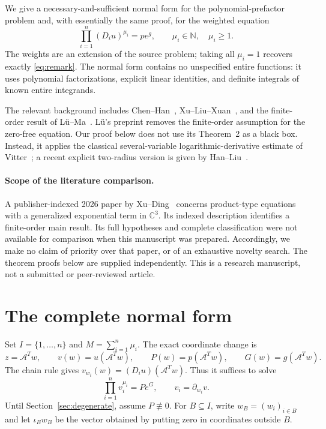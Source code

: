 \documentclass[11pt]{article}
\numberwithin{equation}{section}
\theoremstyle{definition}\newtheorem{definition}[theorem]{Definition}
\theoremstyle{remark}\newtheorem{remark}[theorem]{Remark}
\newcommand{\C}{\mathbb C}
\newcommand{\N}{\mathbb N}
\newcommand{\Ac}{\mathcal A}
\begin{document}
We give a necessary-and-sufficient normal form for the polynomial-prefactor
problem and, with essentially the same proof, for the weighted equation
\begin{equation}\label{eq:weighted-original}
 \prod_{i=1}^n (D_i u)^{\mu_i}=p e^g,
 \qquad \mu_i\in\N,\quad \mu_i\geq1.
\end{equation}
The weights are an extension of the source problem; taking all $\mu_i=1$
recovers exactly \eqref{eq:remark}. The normal form contains no unspecified
entire functions: it uses polynomial factorizations, explicit linear
identities, and definite integrals of known entire integrands.

The relevant background includes Chen--Han~\cite{ChenHan2022},
Xu--Liu--Xuan~\cite{XuLiuXuan2025}, and the finite-order result of
L\"u--Ma~\cite{LuMa2026}. L\"u's preprint removes the finite-order
assumption for the zero-free equation. Our proof below does not use its
Theorem~2 as a black box. Instead, it applies the classical
several-variable logarithmic-derivative estimate of Vitter~\cite{Vitter1977};
a recent explicit two-radius version is given by
Han--Liu~\cite{HanLiu2025}.

\paragraph{Scope of the literature comparison.}
A publisher-indexed 2026 paper by Xu--Ding~\cite{XuDing2026} concerns
product-type equations with a generalized exponential term in $\C^3$.
Its indexed description identifies a finite-order main result. Its full
hypotheses and complete classification were not available for comparison
when this manuscript was prepared. Accordingly, we make no claim of
priority over that paper, or of an exhaustive novelty search. The theorem
proofs below are supplied independently. This is a research manuscript,
not a submitted or peer-reviewed article.

\section{The complete normal form}
Set $I=\{1,\ldots,n\}$ and $M=\sum_{i=1}^n\mu_i$. The exact coordinate
change is
\begin{equation}\label{eq:change}
 z=\Ac^T w,\qquad v(w)=u(\Ac^T w),\qquad
 P(w)=p(\Ac^T w),\qquad G(w)=g(\Ac^T w).
\end{equation}
The chain rule gives $v_{w_i}(w)=(D_i u)(\Ac^T w)$. Thus it suffices to solve
\begin{equation}\label{eq:canonical}
 \prod_{i=1}^n v_i^{\mu_i}=P e^G,
 \qquad v_i=\partial_{w_i}v.
\end{equation}
Until Section~\ref{sec:degenerate}, assume $P\not\equiv0$.
For $B\subseteq I$, write $w_B=(w_i)_{i\in B}$ and let $\iota_B w_B$
be the vector obtained by putting zero in coordinates outside $B$.
\end{document}
